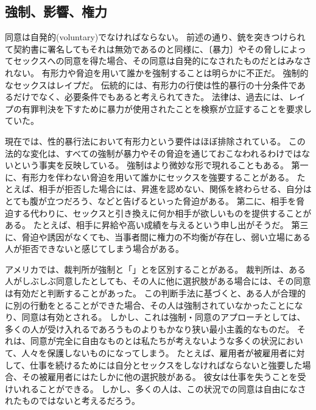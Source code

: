 \documentclass[paper=a4,book,openany]{jlreq} \usepackage{mystyle}
\begin{document}
\subsection{強制、影響、権力}

同意は自発的(voluntary)でなければならない。
前述の通り、銃を突きつけられて契約書に署名してもそれは無効であるのと同様に、〔暴力〕やその脅しによってセックスへの同意を得た場合、その同意は自発的になされたものだとはみなされない。
有形力や脅迫を用いて誰かを強制することは明らかに不正だ。
強制的なセックスはレイプだ。
伝統的には、有形力の行使は性的暴行の十分条件であるだけでなく、必要条件でもあると考えられてきた。
法律は、過去には、レイプの有罪判決を下すために暴力が使用されたことを検察が立証することを要求していた。

現在では、性的暴行法において有形力という要件はほぼ排除されている。
この法的な変化は、すべての強制が暴力やその脅迫を通じておこなわれるわけではないという事実を反映している。
強制はより微妙な形で現れることもある。
第一に、有形力を伴わない脅迫を用いて誰かにセックスを強要することがある。
たとえば、相手が拒否した場合には、昇進を認めない、関係を終わらせる、自分はとても腹が立つだろう、などと告げるといった脅迫がある。
第二に、相手を脅迫する代わりに、セックスと引き換えに何か相手が欲しいものを提供することがある。
たとえば、相手に昇給や高い成績を与えるという申し出がそうだ。
第三に、脅迫や誘因がなくても、当事者間に権力の不均衡が存在し、弱い立場にある人が拒否できないと感じてしまう場合がある。

アメリカでは、裁判所が強制と「」とを区別することがある。
裁判所は、ある人がしぶしぶ同意したとしても、その人に他に選択肢がある場合には、その同意は有効だと判断することがあった\citep[p.130]{buchhandler-raphael11:_failur_consen}。
この判断手法に基づくと、ある人が合理的に別の行動をとることができた場合、その人は強制されていなかったことになり、同意は有効とされる。
しかし、これは強制・同意のアプローチとしては、多くの人が受け入れるであろうものよりもかなり狭い最小主義的なものだ。
それは、同意が完全に自由なものとは私たちが考えないような多くの状況において、人々を保護しないものになってしまう。
たとえば、雇用者が被雇用者に対して、仕事を続けるためには自分とセックスをしなければならないと強要した場合、その被雇用者にはたしかに他の選択肢がある。
彼女は仕事を失うことを受けいれることができる。
しかし、多くの人は、この状況での同意は自由になされたものではないと考えるだろう。
\end{document}

